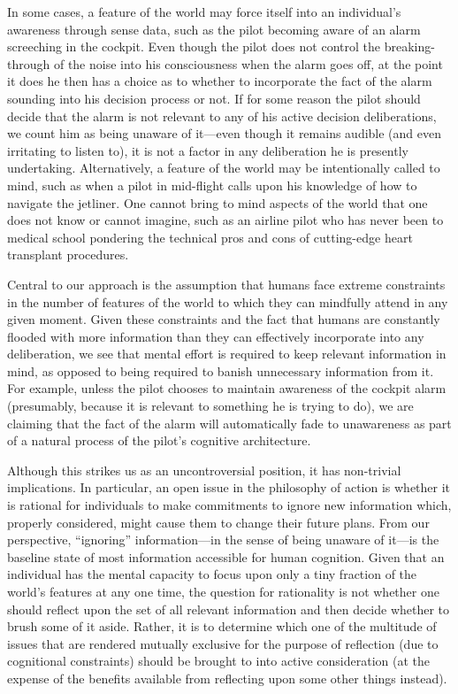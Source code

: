 \documentclass[
11pt,
titlepage,
reqno,
]{article}%
\theoremstyle{definition}
\begin{document}
	In some cases, a feature of the world may force itself into an individual's awareness through sense data, such as the pilot becoming aware of an alarm screeching in the cockpit.
	Even though the pilot does not control the breaking-through of the noise into his consciousness when the alarm goes off, at the point it does he then has a choice as to whether to incorporate the fact of the alarm sounding into his decision process or not.
	If for some reason the pilot should decide that the alarm is not relevant to any of his active decision deliberations, we count him as being unaware of it---even though it remains audible (and even irritating to listen to), it is not a factor in any deliberation he is presently undertaking.
	Alternatively, a feature of the world may be intentionally called to mind, such as when a pilot in mid-flight calls upon his knowledge of how to navigate the jetliner. 
	One cannot bring to mind aspects of the world that one does not know or cannot imagine, such as an airline pilot who has never been to medical school pondering the technical pros and cons of cutting-edge heart transplant procedures. 
	
	Central to our approach is the assumption that humans face extreme constraints in the number of features of the world to which they can mindfully attend in any given moment.
	Given these constraints and the fact that humans are constantly flooded with more information than they can effectively incorporate into any deliberation, we see that mental effort is required to keep relevant information in mind, as opposed to being required to banish unnecessary information from it.
	For example, unless the pilot chooses to maintain awareness of the cockpit alarm (presumably, because it is relevant to something he is trying to do), we are claiming that the fact of the alarm will automatically fade to unawareness as part of a natural process of the pilot's  cognitive architecture. 
	
	Although this strikes us as an uncontroversial position, it has non-trivial implications.
	In particular, an open issue in the philosophy of action is whether it is rational for individuals to make commitments to ignore new information which, properly considered, might cause them to change their future plans.
	From our perspective, ``ignoring'' information---in the sense of being unaware of it---is the baseline state of most information accessible for human cognition.
	Given that an individual has the mental capacity to focus upon only a tiny fraction of the world's features at any one time, the question for rationality is not whether one should reflect upon the set of all relevant information and then decide whether to brush some of it aside.
	Rather, it is to determine which one of the multitude of issues that are rendered mutually exclusive for the purpose of reflection (due to cognitional constraints) should be brought to into active consideration (at the expense of the benefits available from reflecting upon some other things instead).
	
\end{document}
